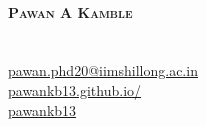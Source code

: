 \begin{minipage}[c]{0.05\textwidth}
\-\
\end{minipage}

\begin{minipage}[]{0.4\textwidth}
    \textbf{\huge \scshape{Pawan A Kamble \\}}\\
    \faPhone \hspace{3pt}{+91 7709021424} \\
    \faEnvelope \hspace{3pt} \href{mailto:pawan.phd20@iimshillong.ac.in}{pawan.phd20@iimshillong.ac.in} \\
    \faGlobe \hspace{3pt} \href{https://pawankb13.github.io/}{pawankb13.github.io/}\\
    \faLinkedin \hspace{3pt} \href{https://www.linkedin.com/in/pawankb13/}{pawankb13}
\end{minipage}

\hfill
\begin{minipage}[c]{0.2\textwidth}
\end{minipage}
